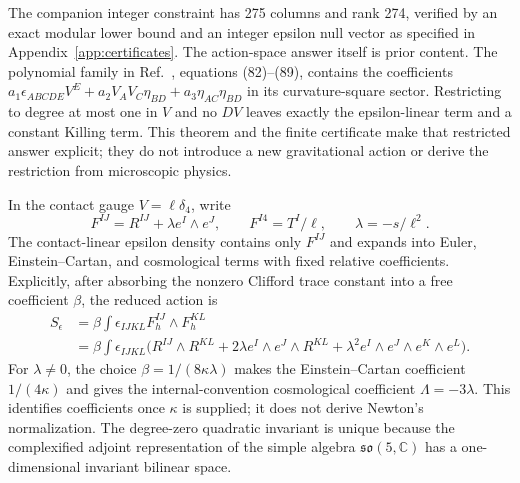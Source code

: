 \documentclass[11pt]{article}
\theoremstyle{remark}\newtheorem{remark}[theorem]{Remark}
\begin{document}
The companion integer constraint has 275 columns and rank 274, verified by
an exact modular lower bound and an integer epsilon null vector as specified
in Appendix~\ref{app:certificates}.
The action-space answer itself is prior content.
The polynomial family in Ref.~\cite{WestmanZlosnikIntro}, equations
(82)--(89), contains the coefficients
$a_1\epsilon_{ABCDE}V^E+a_2V_AV_C\eta_{BD}+a_3\eta_{AC}\eta_{BD}$
in its curvature-square sector.
Restricting to degree at most one in $V$ and no $DV$ leaves exactly the
epsilon-linear term and a constant Killing term.
This theorem and the finite certificate make that restricted answer
explicit; they do not introduce a new gravitational action or derive the
restriction from microscopic physics.

In the contact gauge $V=\ell\delta_4$, write
\begin{equation}
 F^{IJ}=R^{IJ}+\lambda e^I\wedge e^J,\qquad
 F^{I4}=T^I/\ell,\qquad \lambda=-s/\ell^2.
 \label{eq:curvature-split}
\end{equation}
The contact-linear epsilon density contains only $F^{IJ}$ and expands into Euler,
Einstein--Cartan, and cosmological terms with fixed relative coefficients.
Explicitly, after absorbing the nonzero Clifford trace constant into a free
coefficient $\beta$, the reduced action is
\begin{align}
 S_\epsilon
 &=\beta\int\epsilon_{IJKL}F_h^{IJ}\wedge F_h^{KL}\nonumber\\
 &=\beta\int\epsilon_{IJKL}\bigl(
 R^{IJ}\wedge R^{KL}
 +2\lambda e^I\wedge e^J\wedge R^{KL}
 +\lambda^2 e^I\wedge e^J\wedge e^K\wedge e^L\bigr).
 \label{eq:explicit-action}
\end{align}
For $\lambda\ne0$, the choice $\beta=1/(8\kappa\lambda)$ makes the
Einstein--Cartan coefficient $1/(4\kappa)$ and gives the internal-convention
cosmological coefficient $\Lambda=-3\lambda$.
This identifies coefficients once $\kappa$ is supplied; it does not derive
Newton's normalization.
The degree-zero quadratic invariant is unique because the complexified
adjoint representation of the simple algebra $\mathfrak{so}(5,\mathbb C)$
has a one-dimensional invariant bilinear space.
\end{document}
